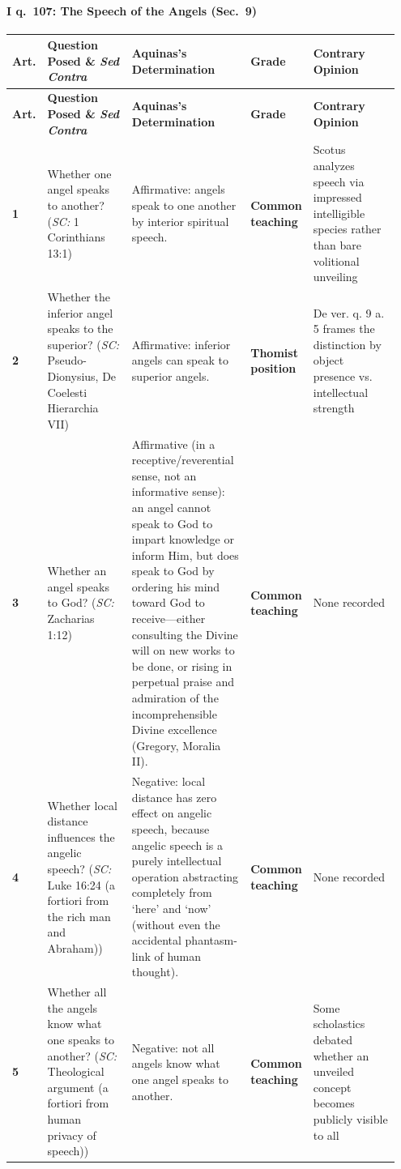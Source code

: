 \paragraph{I q.~107: The Speech of the Angels (Sec.~9)}
{\scriptsize
\setlength{\tabcolsep}{2.5pt}
\renewcommand{\arraystretch}{1.15}
\begin{longtable}{>{\raggedright\arraybackslash}p{0.05\linewidth}>{\raggedright\arraybackslash}p{0.23\linewidth}>{\raggedright\arraybackslash}p{0.31\linewidth}>{\raggedright\arraybackslash}p{0.12\linewidth}>{\raggedright\arraybackslash}p{0.24\linewidth}}
\toprule
\textbf{Art.} & \textbf{Question Posed \& \emph{Sed Contra}} & \textbf{Aquinas's Determination} & \textbf{Grade} & \textbf{Contrary Opinion} \\
\midrule
\endfirsthead
\toprule
\textbf{Art.} & \textbf{Question Posed \& \emph{Sed Contra}} & \textbf{Aquinas's Determination} & \textbf{Grade} & \textbf{Contrary Opinion} \\
\midrule
\endhead
\bottomrule
\endfoot
\textbf{1} & Whether one angel speaks to another? (\emph{SC:} 1 Corinthians 13:1) & Affirmative: angels speak to one another by interior spiritual speech. & \textbf{Common teaching} & Scotus analyzes speech via impressed intelligible species rather than bare volitional unveiling \\
\addlinespace[1.5pt]
\textbf{2} & Whether the inferior angel speaks to the superior? (\emph{SC:} Pseudo-Dionysius, De Coelesti Hierarchia VII) & Affirmative: inferior angels can speak to superior angels. & \textbf{Thomist position} & De ver. q. 9 a. 5 frames the distinction by object presence vs. intellectual strength \\
\addlinespace[1.5pt]
\textbf{3} & Whether an angel speaks to God? (\emph{SC:} Zacharias 1:12) & Affirmative (in a receptive/reverential sense, not an informative sense): an angel cannot speak to God to impart knowledge or inform Him, but does speak to God by ordering his mind toward God to receive---either consulting the Divine will on new works to be done, or rising in perpetual praise and admiration of the incomprehensible Divine excellence (Gregory, Moralia II). & \textbf{Common teaching} & None recorded \\
\addlinespace[1.5pt]
\textbf{4} & Whether local distance influences the angelic speech? (\emph{SC:} Luke 16:24 (a fortiori from the rich man and Abraham)) & Negative: local distance has zero effect on angelic speech, because angelic speech is a purely intellectual operation abstracting completely from `here' and `now' (without even the accidental phantasm-link of human thought). & \textbf{Common teaching} & None recorded \\
\addlinespace[1.5pt]
\textbf{5} & Whether all the angels know what one speaks to another? (\emph{SC:} Theological argument (a fortiori from human privacy of speech)) & Negative: not all angels know what one angel speaks to another. & \textbf{Common teaching} & Some scholastics debated whether an unveiled concept becomes publicly visible to all \\
\end{longtable}
}

